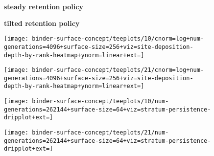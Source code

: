 \begin{figure*}
  \centering
\begin{subfigure}[b]{0.43\linewidth}
\centering
\textbf{steady retention policy}
\end{subfigure}
\begin{subfigure}[b]{0.43\linewidth}
\centering
\textbf{tilted retention policy}
\end{subfigure}

\vspace{-1.5ex}

  \begin{subfigure}[b]{0.5\linewidth}
    \centering
  \texttt{[image: binder-surface-concept/teeplots/10/cnorm=log+num-generations=4096+surface-size=256+viz=site-deposition-depth-by-rank-heatmap+ynorm=linear+ext=]}


  \end{subfigure}%
  \begin{subfigure}[b]{0.5\linewidth}
    \centering
  \texttt{[image: binder-surface-concept/teeplots/21/cnorm=log+num-generations=4096+surface-size=256+viz=site-deposition-depth-by-rank-heatmap+ynorm=linear+ext=]}


  \end{subfigure}

\vspace{-1ex}

\begin{subfigure}[b]{0.5\linewidth}
  \flushleft
\texttt{[image: binder-surface-concept/teeplots/10/num-generations=262144+surface-size=64+viz=stratum-persistence-dripplot+ext=]}


  \label{fig:steady-retention-plot}
\end{subfigure}%
\begin{subfigure}[b]{0.5\linewidth}
  \centering
\texttt{[image: binder-surface-concept/teeplots/21/num-generations=262144+surface-size=64+viz=stratum-persistence-dripplot+ext=]}


\end{subfigure}
\end{figure*}
